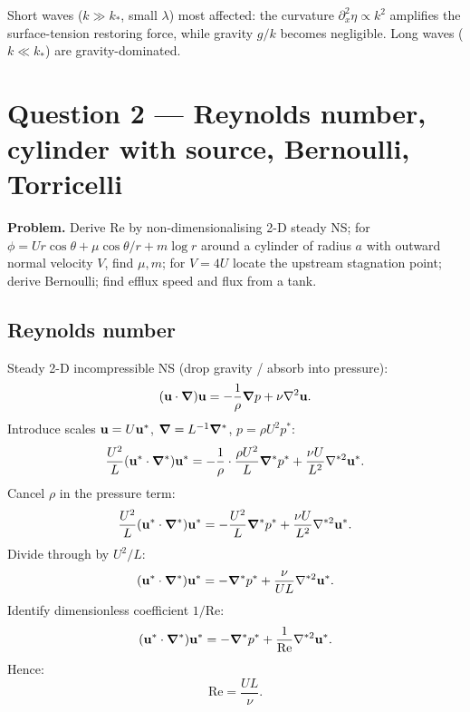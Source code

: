\documentclass[11pt]{article}
\newcommand{\Lap}{\nabla^{2}}
\begin{document}
\begin{center}
\end{center}

Short waves ($k\gg k_{*}$, small $\lambda$) most affected: the curvature $\partial_x^{2}\eta\propto k^{2}$ amplifies the surface-tension restoring force, while gravity $g/k$ becomes negligible. Long waves ($k\ll k_*$) are gravity-dominated.

\section*{Question 2 --- Reynolds number, cylinder with source, Bernoulli, Torricelli}

\textbf{Problem.} Derive Re by non-dimensionalising 2-D steady NS; for $\phi=Ur\cos\theta+\mu\cos\theta/r+m\log r$ around a cylinder of radius $a$ with outward normal velocity $V$, find $\mu,m$; for $V=4U$ locate the upstream stagnation point; derive Bernoulli; find efflux speed and flux from a tank.

\subsection*{Reynolds number}

Steady 2-D incompressible NS (drop gravity / absorb into pressure):
\[ (\vb u\cdot\grad)\vb u=-\frac{1}{\rho}\grad p+\nu\Lap\vb u. \]
Introduce scales $\vb u=U\vb u^{*}$, $\grad=L^{-1}\grad^{*}$, $p=\rho U^{2}p^{*}$:
\[ \frac{U^{2}}{L}(\vb u^{*}\cdot\grad^{*})\vb u^{*}=-\frac{1}{\rho}\cdot\frac{\rho U^{2}}{L}\grad^{*}p^{*}+\frac{\nu U}{L^{2}}\nabla^{*2}\vb u^{*}. \]
Cancel $\rho$ in the pressure term:
\[ \frac{U^{2}}{L}(\vb u^{*}\cdot\grad^{*})\vb u^{*}=-\frac{U^{2}}{L}\grad^{*}p^{*}+\frac{\nu U}{L^{2}}\nabla^{*2}\vb u^{*}. \]
Divide through by $U^{2}/L$:
\[ (\vb u^{*}\cdot\grad^{*})\vb u^{*}=-\grad^{*}p^{*}+\frac{\nu}{UL}\nabla^{*2}\vb u^{*}. \]
Identify dimensionless coefficient $1/\mathrm{Re}$:
\[ (\vb u^{*}\cdot\grad^{*})\vb u^{*}=-\grad^{*}p^{*}+\frac{1}{\mathrm{Re}}\nabla^{*2}\vb u^{*}. \]
Hence:
\[ \boxed{\;\mathrm{Re}=\frac{UL}{\nu}.\;} \]
\end{document}
